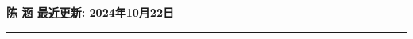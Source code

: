 \documentclass[10pt]{article}
\newcommand{\makeheading}[1]%
        {\hspace*{-\marginparsep minus \marginparwidth}%
         \begin{minipage}[t]{\textwidth+\marginparwidth+\marginparsep}%
                {\large \bfseries #1}\\[-0.15\baselineskip]%
                 \rule{\columnwidth}{1pt}%
         \end{minipage}}
\renewcommand{\section}[2]%
        {\pagebreak[2]\vspace{1\baselineskip}%
         \phantomsection\addcontentsline{toc}{section}{#1}%
         \hspace{0in}%
         \marginpar{
         \raggedright \scshape #1}#2}
\newenvironment{outerlist}[1][\enskip\textbullet]%
        {%
        \begin{itemize}[label=#1, itemsep=1pt]}{\end{itemize}%
         \vspace{-0.6\baselineskip}}
\begin{document}



\pagebreak
	
\makeheading{陈 涵 \hfill {\small 最近更新: 2024年10月22日}}


\vspace{-0.2in}
\end{document}
